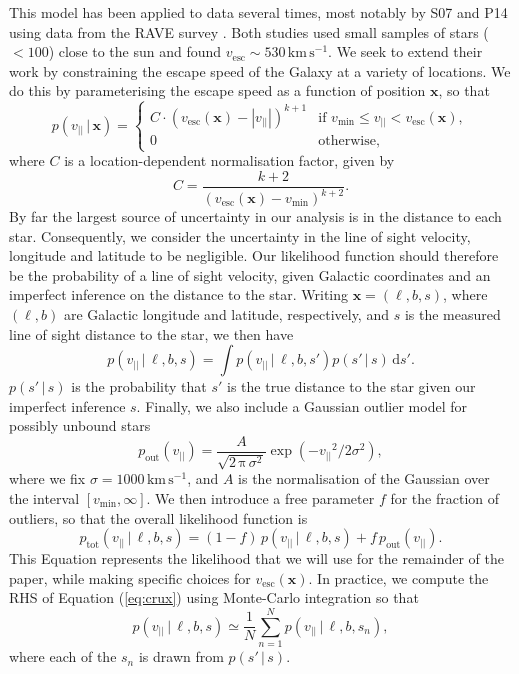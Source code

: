 \documentclass[useAMS,twocolumn,usenatbib]{mn2e}
\def\kms{{\,\mathrm{km\,s^{-1}}}}
\def\vlos{{v_{||}}}
\def\vesc{{v_\mathrm{esc}}}
\def\vmin{{v_\mathrm{min}}}
\def\pos{{\boldsymbol{x}}}
\def\intd{{\mathrm{d}}}
\begin{document}
This model has been applied to data several times, most notably by S07 and P14 using data from the {\sc RAVE} survey \citep{Ko13}. 
Both studies used small samples of stars ($<100$) close to the sun and found $\vesc \sim 530\kms$. 
We seek to extend their work by constraining the escape speed of the Galaxy at a variety of locations. 
We do this by parameterising the escape speed as a function of position $\pos$, so that
%
\begin{equation}
  p(\vlos \,|\, \pos) = \begin{cases}
    C\cdot(\vesc(\pos) - |\vlos|)^{k+1} & \text{if $\vmin \leq \vlos <\vesc(\pos)$},\\
    0 & \text{otherwise},
  \end{cases}
  \label{eq:model}
\end{equation}
%
where $C$ is a location-dependent normalisation factor, given by
%
\begin{equation}
C = \dfrac{k+2}{(\vesc(\pos) - \vmin)^{k+2}}.
\label{eq:norm}
\end{equation}
%
By far the largest source of uncertainty in our analysis is in the distance to each star. 
Consequently, we consider the uncertainty in the line of sight velocity, longitude and latitude to be negligible. 
Our likelihood function should therefore be the probability of a line of sight velocity, given Galactic coordinates and an imperfect inference on the distance to the star. 
Writing $\pos = (\ell, b, s)$, where $(\ell,b)$ are Galactic longitude and latitude, respectively, and $s$ is the measured line of sight distance to the star, we then have
%
\begin{equation}
p(\vlos \,|\, \ell, b, s) = \int p(\vlos \,| \,\ell, b, s' )p(s'\,|\,s)\, \intd s'.
\label{eq:crux}
\end{equation}
%
$p(s'\,|\,s)$ is the probability that $s'$ is the true distance to the star given our imperfect inference $s$. 
Finally, we also include a Gaussian outlier model for possibly unbound stars
%
\begin{equation}
p_\mathrm{out}(\vlos) = \dfrac{A}{\sqrt{2\,\mathrm{\pi}\,\sigma^2}}\exp\left(-\vlos^2/2\sigma^2\right),
\end{equation}
%
where we fix $\sigma = 1000\kms$, and $A$ is the normalisation of the Gaussian over the interval $\left[v_\mathrm{min},\infty\right]$. 
We then introduce a free parameter $f$ for the fraction of outliers, so that the overall likelihood function is
%
\begin{equation}
p_\mathrm{tot}(\vlos \,|\, \ell, b, s) = (1-f)\,p(\vlos \,|\, \ell, b, s) + f\,p_\mathrm{out}(\vlos).
\end{equation}
%
This Equation represents the likelihood that we will use for the remainder of the paper, while making specific choices for $\vesc(\pos)$. 
In practice, we compute the RHS of Equation (\ref{eq:crux}) using Monte-Carlo integration so that
%
\begin{equation}
p(\vlos \,|\, \ell, b, s) \simeq \dfrac{1}{N}\sum\limits_{n=1}^{N} p(\vlos \,| \,\ell, b, s_n ),
\end{equation}
%
where each of the $s_n$ is drawn from $p(s'\,|\,s)$.
\end{document}

